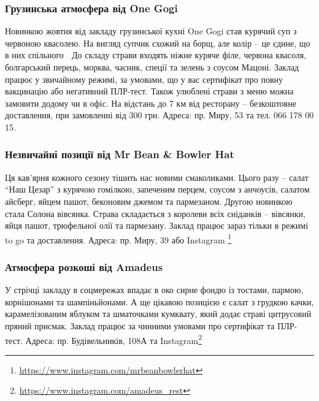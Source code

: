 \subsubsection{Грузинська атмосфера від One Gogi}


Новинкою жовтня від закладу грузинської кухні One Gogi став курячий суп з
червоною квасолею. На вигляд супчик схожий на борщ, але колір – це єдине, що в
них спільного 🙂 До складу страви входять ніжне куряче філе, червона квасоля,
болгарський перець, морква, часник, спеції та зелень з соусом Мацоні. Заклад
працює у звичайному режимі, за умовами, що у вас сертифікат про повну
вакцинацію або негативний ПЛР-тест. Також улюблені страви з меню можна замовити
додому чи в офіс. На відстань до 7 км від ресторану – безкоштовне доставлення,
при замовленні від 300 грн. Адреса: пр. Миру, 53 та тел. 066 178 00 15.

\subsubsection{Незвичайні позиції від Mr Bean \& Bowler Hat}


Ця кав'ярня кожного сезону тішить нас новими смаколиками. Цього разу – салат
\enquote{Наш Цезар} з курячою гомілкою, запеченим перцем, соусом з анчоусів, салатом
айсберг, яйцем пашот, беконовим джемом та пармезаном. Другою новинкою стала
Солона вівсянка. Страва складається з королеви всіх сніданків – вівсянки, яйця
пашот, трюфельної олії та пармезану. Заклад працює зараз тільки в режимі to go
та доставлення. Адреса: пр. Миру, 39 або Instagram \footnote{\url{https://www.instagram.com/mrbeanbowlerhat}}

\subsubsection{Атмосфера розкоші від Amadeus}


У стрічці закладу в соцмережах впадає в око сирне фондю із тостами, пармою,
корнішонами та шампіньйонами. А ще цікавою позицією є салат з грудкою качки,
карамелізованим яблуком та шматочками кумквату, який додає страві цитрусовий
пряний присмак. Заклад працює за чинними умовами про сертифікат та ПЛР-тест.
Адреса: пр. Будівельників, 108А та Instagram\footnote{\url{https://www.instagram.com/amadeus_rest}}

